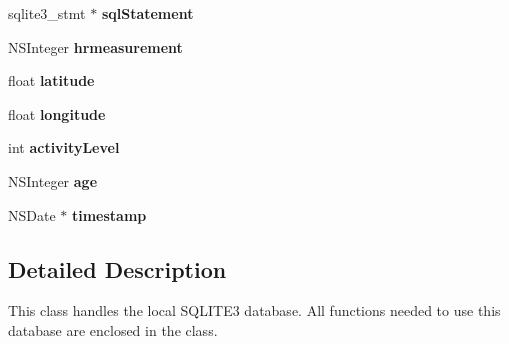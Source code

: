 \begin{DoxyCompactItemize}
\item 
\hypertarget{interface_d_b_manager_ae714f21433f7593c722b727d2ae9c66a}{sqlite3\-\_\-stmt $\ast$ {\bfseries sql\-Statement}}\label{interface_d_b_manager_ae714f21433f7593c722b727d2ae9c66a}

\item 
\hypertarget{interface_d_b_manager_ac89481f8c2c45def2b8edb2ba749df68}{N\-S\-Integer {\bfseries hrmeasurement}}\label{interface_d_b_manager_ac89481f8c2c45def2b8edb2ba749df68}

\item 
\hypertarget{interface_d_b_manager_a12dcee066d2cecde8507a6529df92521}{float {\bfseries latitude}}\label{interface_d_b_manager_a12dcee066d2cecde8507a6529df92521}

\item 
\hypertarget{interface_d_b_manager_aa881cd8f0940350240e3ae9a326e5563}{float {\bfseries longitude}}\label{interface_d_b_manager_aa881cd8f0940350240e3ae9a326e5563}

\item 
\hypertarget{interface_d_b_manager_aff07ccf2439a2df78a5375303d5272a7}{int {\bfseries activity\-Level}}\label{interface_d_b_manager_aff07ccf2439a2df78a5375303d5272a7}

\item 
\hypertarget{interface_d_b_manager_a0d952846514339beeb1ff00a89fd650e}{N\-S\-Integer {\bfseries age}}\label{interface_d_b_manager_a0d952846514339beeb1ff00a89fd650e}

\item 
\hypertarget{interface_d_b_manager_a62443c98d9fade6ab9906836bf146b72}{N\-S\-Date $\ast$ {\bfseries timestamp}}\label{interface_d_b_manager_a62443c98d9fade6ab9906836bf146b72}

\end{DoxyCompactItemize}


\subsection{Detailed Description}
This class handles the local S\-Q\-L\-I\-T\-E3 database. All functions needed to use this database are enclosed in the class. 


